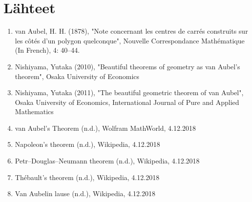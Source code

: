 \documentclass{scrartcl}
\begin{document}
\section{Lähteet}
\begin{enumerate}
\item van Aubel, H. H. (1878), "Note concernant les centres de carrés construits sur les côtés d'un polygon quelconque", Nouvelle Correspondance Mathématique (In French), 4: 40–44.

\item Nishiyama, Yutaka (2010), "Beautiful theorems of geometry as van Aubel's theorem", Osaka University of Economics

\item Nishiyama, Yutaka (2011), "The beautiful geometric theorem of van Aubel", Osaka University of Economics, International Journal of Pure and Applied Mathematics

\item van Aubel's Theorem (n.d.), Wolfram MathWorld, 4.12.2018

\item Napoleon's theorem (n.d.), Wikipedia, 4.12.2018

\item Petr–Douglas–Neumann theorem (n.d.), Wikipedia, 4.12.2018

\item Thébault's theorem (n.d.), Wikipedia, 4.12.2018

\item Van Aubelin lause (n.d.), Wikipedia, 4.12.2018

\end{enumerate}
\end{document}
